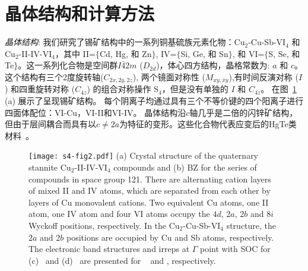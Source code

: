\section{晶体结构和计算方法}
{\it{晶体结构}}: 我们研究了锡矿结构中的一系列铜基硫族元素化物：Cu$_2$-Cu-Sb-VI$_4$ 和 Cu$_2$-II-IV-VI$_4$，其中 II=$\{$Cd, Hg, 和 Zn$\}$, IV=$\{$Si, Ge, 和 Sn$\}$, 和 VI=$\{$S, Se, 和 Te$\}$。这一系列化合物是空间群$I \bar 4 2 m$ ($D_{2d} $)，体心四方结构，晶格常数为: $a$ 和 $c$。
这个结构有三个2度旋转轴($C_{2x,2y,2z}$), 两个镜面对称性 ($M_{xy,\bar xy}$),有时间反演对称 ($I$) 和四重旋转对称 ($C_{4z}$) 的组合对称操作 S$_4$，但是没有单独的 $I$ 和 $C_{4z}$。
在图~\ref{fig:5-2} (a) 展示了呈现锡矿结构。
每个阴离子均通过具有三个不等价键的四个阳离子进行四面体配位：VI-Cu，VI-II和VI-IV。
晶体结构沿$ c $轴几乎是二倍的闪锌矿结构，但由于层间耦合而具有以$c\neq2a$为特征的变形。这些化合物代表应变后的HgTe类材料~\citep{HgTenc2016}。

\begin{figure}[!tb]
\centering
\texttt{[image: s4-fig2.pdf]}
    {
    (a) Crystal structure of the quaternary stannite Cu$_2$-II-IV-VI$_4$ compounds and (b) BZ for the series of compounds in space group 121. There are alternating cation layers of mixed II and IV atoms, which are separated from each other by layers of Cu monovalent cations. Two equivalent Cu atoms, one II atom, one IV atom and four VI atoms occupy the $4d$, $2a$, $2b$ and $8i$ Wyckoff positions, respectively. In the Cu$_2$-Cu-Sb-VI$_4$ structure, the $2a$ and $2b$ positions are occupied by Cu and Sb atoms, respectively.
    The electronic band structures and irreps at $\Gamma$ point with SOC for (c) \tic~and (d) \wsmc~are presented for \tii~ and \wsm, respectively. ~\citep{Qians4}
    } \label{fig:5-2}
\end{figure}


